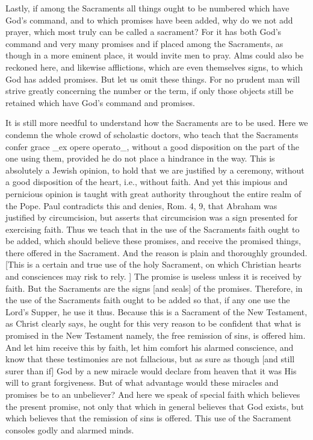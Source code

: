 Lastly, if among the Sacraments all things ought to be numbered which
have God's command, and to which promises have been added, why do we
not add prayer, which most truly can be called a sacrament?  For it
has both God's command and very many promises and if placed among the
Sacraments, as though in a more eminent place, it would invite men to
pray.  Alms could also be reckoned here, and likewise afflictions,
which are even themselves signs, to which God has added promises.
But let us omit these things.  For no prudent man will strive greatly
concerning the number or the term, if only those objects still be
retained which have God's command and promises.

It is still more needful to understand how the Sacraments are to be
used.  Here we condemn the whole crowd of scholastic doctors, who
teach that the Sacraments confer grace _ex opere operato_, without a
good disposition on the part of the one using them, provided he do
not place a hindrance in the way.  This is absolutely a Jewish
opinion, to hold that we are justified by a ceremony, without a good
disposition of the heart, i.e., without faith.  And yet this impious
and pernicious opinion is taught with great authority throughout the
entire realm of the Pope.  Paul contradicts this and denies, Rom. 4,
9, that Abraham was justified by circumcision, but asserts that
circumcision was a sign presented for exercising faith.  Thus we
teach that in the use of the Sacraments faith ought to be added,
which should believe these promises, and receive the promised things,
there offered in the Sacrament.  And the reason is plain and
thoroughly grounded.  [This is a certain and true use of the holy
Sacrament, on which Christian hearts and consciences may risk to rely.
] The promise is useless unless it is received by faith.  But the
Sacraments are the signs [and seals] of the promises.  Therefore, in
the use of the Sacraments faith ought to be added so that, if any one
use the Lord's Supper, he use it thus.  Because this is a Sacrament
of the New Testament, as Christ clearly says, he ought for this very
reason to be confident that what is promised in the New Testament
namely, the free remission of sins, is offered him.  And let him
receive this by faith, let him comfort his alarmed conscience, and
know that these testimonies are not fallacious, but as sure as though
[and still surer than if] God by a new miracle would declare from
heaven that it was His will to grant forgiveness.  But of what
advantage would these miracles and promises be to an unbeliever?  And
here we speak of special faith which believes the present promise,
not only that which in general believes that God exists, but which
believes that the remission of sins is offered.  This use of the
Sacrament consoles godly and alarmed minds.

